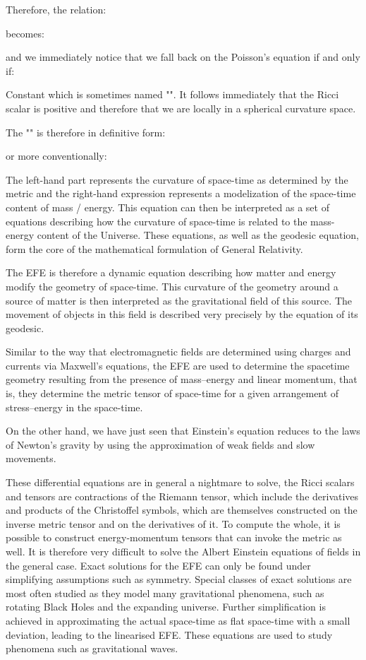 	Therefore, the relation:
	
	becomes:
	
	and we immediately notice that we fall back on the Poisson's equation if and only if:
	
	Constant which is sometimes named "". It follows immediately that the Ricci scalar is positive and therefore that we are locally in a spherical curvature space.

	The "" is therefore in definitive form:
	
	or more conventionally:
	
	The left-hand part represents the curvature of space-time as determined by the metric and the right-hand expression represents a modelization of the space-time content of mass / energy. This equation can then be interpreted as a set of equations describing how the curvature of space-time is related to the mass-energy content of the Universe. These equations, as well as the geodesic equation, form the core of the mathematical formulation of General Relativity.
	
	The EFE  is therefore a dynamic equation describing how matter and energy modify the geometry of space-time. This curvature of the geometry around a source of matter is then interpreted as the gravitational field of this source. The movement of objects in this field is described very precisely by the equation of its geodesic.
	
	Similar to the way that electromagnetic fields are determined using charges and currents via Maxwell's equations, the EFE are used to determine the spacetime geometry resulting from the presence of mass–energy and linear momentum, that is, they determine the metric tensor of space-time for a given arrangement of stress–energy in the space-time. 

	On the other hand, we have just seen that Einstein's equation reduces to the laws of Newton's gravity by using the approximation of weak fields and slow movements. 
	
	These differential equations are in general a nightmare to solve, the Ricci scalars and tensors are contractions of the Riemann tensor, which include the derivatives and products of the Christoffel symbols, which are themselves constructed on the inverse metric tensor and on the derivatives of it. To compute the whole, it is possible to construct energy-momentum tensors that can invoke the metric as well. It is therefore very difficult to solve the Albert Einstein equations of fields in the general case. Exact solutions for the EFE can only be found under simplifying assumptions such as symmetry. Special classes of exact solutions are most often studied as they model many gravitational phenomena, such as rotating Black Holes and the expanding universe. Further simplification is achieved in approximating the actual space-time as flat space-time with a small deviation, leading to the linearised EFE. These equations are used to study phenomena such as gravitational waves.

